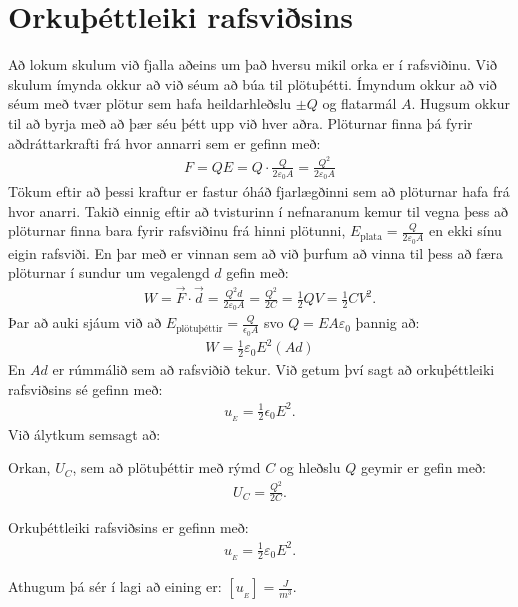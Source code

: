 \newpage

\section{Orkuþéttleiki rafsviðsins}

Að lokum skulum við fjalla aðeins um það hversu mikil orka er í rafsviðinu. Við skulum ímynda okkur að við séum að búa til plötuþétti. Ímyndum okkur að við séum með tvær plötur sem hafa heildarhleðslu $\pm Q$ og flatarmál $A$. Hugsum okkur til að byrja með að þær séu þétt upp við hver aðra. Plöturnar finna þá fyrir aðdráttarkrafti frá hvor annarri sem er gefinn með:
\begin{align*}
    F = QE = Q \cdot \frac{Q}{2\varepsilon_0 A} = \frac{Q^2}{2 \varepsilon_0 A}
\end{align*}
Tökum eftir að þessi kraftur er fastur óháð fjarlægðinni sem að plöturnar hafa frá hvor anarri. Takið einnig eftir að tvisturinn í nefnaranum kemur til vegna þess að plöturnar finna bara fyrir rafsviðinu frá hinni plötunni, $E_{\text{plata}} = \frac{Q}{2\varepsilon_0 A}$ en ekki sínu eigin rafsviði. En þar með er vinnan sem að við þurfum að vinna til þess að færa plöturnar í sundur um vegalengd $d$ gefin með:
\begin{align*}
    W = \Vec{F} \cdot \Vec{d} = \frac{Q^2 d}{2 \varepsilon_0 A} = \frac{Q^2}{2C} = \frac{1}{2}QV  = \frac{1}{2}CV^2.
\end{align*}
Þar að auki sjáum við að $E_{\text{plötuþéttir}} = \frac{Q}{\epsilon_0 A}$ svo $Q = E A \varepsilon_0$ þannig að:
\begin{align*}
    W = \frac{1}{2} \varepsilon_0 E^2 \left(A d \right)
\end{align*}
En $Ad$ er rúmmálið sem að rafsviðið tekur. Við getum því sagt að orkuþéttleiki rafsviðsins sé gefinn með:
\begin{align*}
    u_{\!_E} = \frac{1}{2}\epsilon_0 E^2.
\end{align*}
Við álytkum semsagt að:

\begin{tcolorbox}
\begin{theorem}
Orkan, $U_C$, sem að plötuþéttir með rýmd $C$ og hleðslu $Q$ geymir er gefin með:
\begin{align*}
    U_C = \frac{Q^2}{2C}.
\end{align*}
\end{theorem}
\end{tcolorbox}


\begin{tcolorbox}
\begin{definition}
Orkuþéttleiki rafsviðsins er gefinn með:
\begin{align*}
    u_{\!_E} = \frac{1}{2}\varepsilon_0 E^2.
\end{align*}
\end{definition}
\end{tcolorbox}
Athugum þá sér í lagi að eining er: $\left[ u_{\!_E} \right] = \frac{\si{J}}{\si{m^3}}$.

